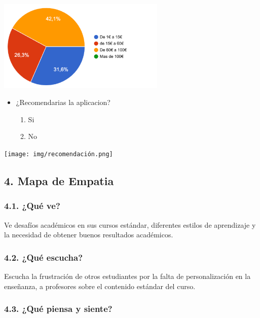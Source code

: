 \documentclass[
]{article}
\providecommand{\tightlist}{%
  \setlength{\itemsep}{0pt}\setlength{\parskip}{0pt}}
\begin{document}
\includegraphics[width=0.6\textwidth,height=\textheight]{img/precio.png}
\newpage

\begin{itemize}
\tightlist
\item
  ¿Recomendarias la aplicacion?

  \begin{enumerate}
  \def\labelenumi{\alph{enumi}.}
  \tightlist
  \item
    Si
  \item
    No
  \end{enumerate}
\end{itemize}

\texttt{[image: img/recomendación.png]}

\newpage

\subsection{4. Mapa de Empatia}\label{mapa-de-empatia}

\subsubsection{4.1. ¿Qué ve?}\label{quuxe9-ve}

Ve desafíos académicos en sus cursos estándar, diferentes estilos de
aprendizaje y la necesidad de obtener buenos resultados académicos.

\subsubsection{4.2. ¿Qué escucha?}\label{quuxe9-escucha}

Escucha la frustración de otros estudiantes por la falta de
personalización en la enseñanza, a profesores sobre el contenido
estándar del curso.

\subsubsection{4.3. ¿Qué piensa y siente?}\label{quuxe9-piensa-y-siente}
\end{document}
